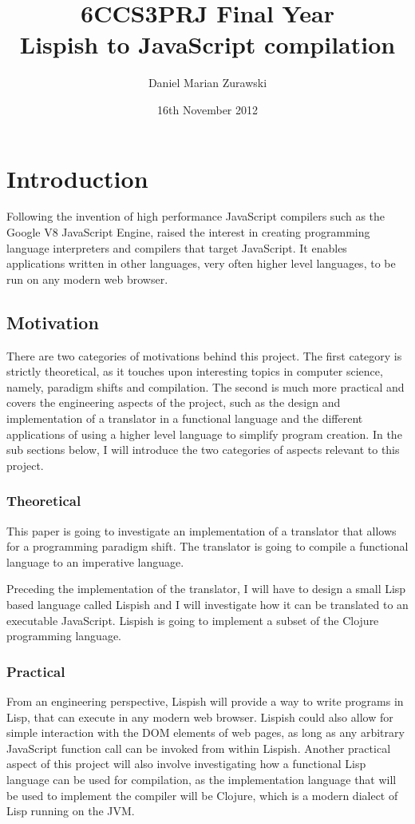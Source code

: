 \documentclass[11pt]{informatics-report}
\title{6CCS3PRJ Final Year\\\vspace{0.2cm}Lispish to JavaScript compilation}
\author{Daniel Marian Zurawski}
\date{16th November 2012}
\begin{document}
\createFrontMatter
\onehalfspacing
\tableofcontents
\doublespacing


\chapter{Introduction}
Following the invention of high performance JavaScript compilers such as the Google V8 JavaScript Engine, raised the interest in creating programming language interpreters and compilers that target JavaScript. It enables applications written in other languages, very often higher level languages, to be run on any modern web browser. \\
 
 \section{Motivation}
There are two categories of motivations behind this project. The first category is strictly theoretical, as it touches upon interesting topics in computer science, namely, paradigm shifts and compilation. The second is much more practical and covers the engineering aspects of the project, such as the design and implementation of a translator in a functional language and the different applications of using a higher level language to simplify program creation. In the sub sections below, I will introduce the two categories of aspects relevant to this project. 

\subsection{Theoretical}
This paper is going to investigate an implementation of a translator that allows for a programming paradigm shift. The translator is going to compile a functional language to an imperative language. 

Preceding the implementation of the translator, I will have to design a small Lisp based language called Lispish and I will investigate how it can be translated to an executable JavaScript. Lispish is going to implement a subset of the Clojure programming language.

\subsection{Practical}
From an engineering perspective, Lispish will provide a way to write programs in Lisp, that can execute in any modern web browser. Lispish could also allow for simple interaction with the DOM elements of web pages, as long as any arbitrary JavaScript function call can be invoked from within Lispish.
Another practical aspect of this project will also involve investigating how a functional Lisp language can be used for compilation, as the implementation language that will be used to implement the compiler will be Clojure, which is a modern dialect of Lisp running on the JVM.  
\end{document}
